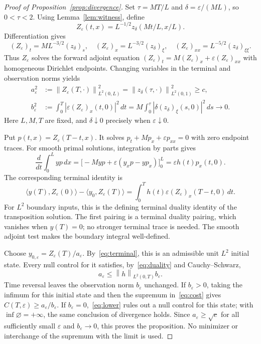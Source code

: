 \documentclass[11pt]{article}
\newcommand{\norm}[1]{\left\|#1\right\|}
\begin{document}
\begin{proof}[Proof of Proposition~\ref{prop:divergence}]
Set $\tau=MT/L$ and $\delta=\varepsilon/(ML)$, so $0<\tau<2$.
Using Lemma~\ref{lem:witness}, define
\[
Z_\varepsilon(t,x)=L^{-1/2}z_\delta(Mt/L,x/L).
\]
Differentiation gives
\[
(Z_\varepsilon)_t=ML^{-3/2}(z_\delta)_s,
\quad (Z_\varepsilon)_x=L^{-3/2}(z_\delta)_\xi,
\quad (Z_\varepsilon)_{xx}=L^{-5/2}(z_\delta)_{\xi\xi}.
\]
Thus $Z_\varepsilon$ solves the forward adjoint equation
$(Z_\varepsilon)_t=M(Z_\varepsilon)_x+
\varepsilon(Z_\varepsilon)_{xx}$ with homogeneous Dirichlet endpoints.
Changing variables in the terminal and observation norms yields
\begin{align}
a_\varepsilon^2
&:=\norm{Z_\varepsilon(T,\cdot)}_{L^2(0,L)}^2
=\norm{z_\delta(\tau,\cdot)}_{L^2(0,1)}^2\geq c,
\label{eq:terminal}\\
b_\varepsilon^2
&:=\int_0^T|\varepsilon(Z_\varepsilon)_x(t,0)|^2\,dt
=M\int_0^\tau|\delta(z_\delta)_\xi(s,0)|^2\,ds
\longrightarrow0.\label{eq:flux}
\end{align}
Here $L,M,T$ are fixed, and $\delta\downarrow0$ precisely when
$\varepsilon\downarrow0$.

Put $p(t,x)=Z_\varepsilon(T-t,x)$. It solves
$p_t+Mp_x+\varepsilon p_{xx}=0$ with zero endpoint traces.
For smooth primal solutions, integration by parts gives
\[
\frac{d}{dt}\int_0^L yp\,dx
=\bigl[-Myp+\varepsilon(y_xp-yp_x)\bigr]_0^L
=\varepsilon h(t)p_x(t,0).
\]
The corresponding terminal identity is
\begin{equation}\label{eq:duality}
\langle y(T),Z_\varepsilon(0)\rangle
-\langle y_0,Z_\varepsilon(T)\rangle
=\int_0^T h(t)\varepsilon(Z_\varepsilon)_x(T-t,0)\,dt.
\end{equation}
For $L^2$ boundary inputs, this is the defining terminal duality identity
of the transposition solution. The first pairing is a terminal duality
pairing, which vanishes when $y(T)=0$; no stronger terminal trace is needed.
The smooth adjoint test makes the boundary integral well-defined.

Choose $y_{0,\varepsilon}=Z_\varepsilon(T)/a_\varepsilon$.
By~\eqref{eq:terminal}, this is an admissible unit $L^2$ initial state.
Every null control for it satisfies, by~\eqref{eq:duality} and
Cauchy--Schwarz,
\begin{equation}\label{eq:lower}
a_\varepsilon
\leq\norm{h}_{L^2(0,T)}b_\varepsilon.
\end{equation}
Time reversal leaves the observation norm $b_\varepsilon$ unchanged.
If $b_\varepsilon>0$, taking the infimum for this initial state and then
the supremum in~\eqref{eq:cost} gives
$C(T,\varepsilon)\geq a_\varepsilon/b_\varepsilon$.
If $b_\varepsilon=0$,~\eqref{eq:lower} rules out a null control for this
state; with $\inf\varnothing=+\infty$, the same conclusion of divergence
holds. Since $a_\varepsilon\geq\sqrt c$ for all sufficiently small
$\varepsilon$ and $b_\varepsilon\to0$, this proves the proposition.
No minimizer or interchange of the supremum with the limit is used.
\end{proof}
\end{document}
